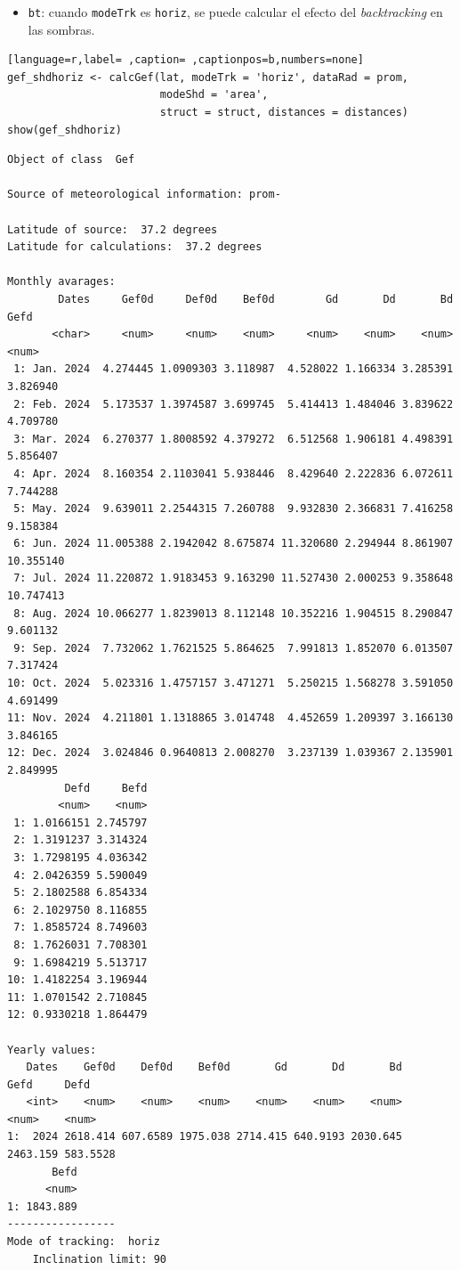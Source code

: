\begin{itemize}
\item \texttt{bt}: cuando \texttt{modeTrk} es \texttt{horiz}, se puede calcular el efecto del \emph{backtracking} en las sombras.
\end{itemize}
\begin{lstlisting}[language=r,label= ,caption= ,captionpos=b,numbers=none]
gef_shdhoriz <- calcGef(lat, modeTrk = 'horiz', dataRad = prom,
                        modeShd = 'area',
                        struct = struct, distances = distances)
show(gef_shdhoriz)
\end{lstlisting}

\begin{verbatim}
Object of class  Gef 

Source of meteorological information: prom- 

Latitude of source:  37.2 degrees
Latitude for calculations:  37.2 degrees

Monthly avarages:
        Dates     Gef0d     Def0d    Bef0d        Gd       Dd       Bd      Gefd
       <char>     <num>     <num>    <num>     <num>    <num>    <num>     <num>
 1: Jan. 2024  4.274445 1.0909303 3.118987  4.528022 1.166334 3.285391  3.826940
 2: Feb. 2024  5.173537 1.3974587 3.699745  5.414413 1.484046 3.839622  4.709780
 3: Mar. 2024  6.270377 1.8008592 4.379272  6.512568 1.906181 4.498391  5.856407
 4: Apr. 2024  8.160354 2.1103041 5.938446  8.429640 2.222836 6.072611  7.744288
 5: May. 2024  9.639011 2.2544315 7.260788  9.932830 2.366831 7.416258  9.158384
 6: Jun. 2024 11.005388 2.1942042 8.675874 11.320680 2.294944 8.861907 10.355140
 7: Jul. 2024 11.220872 1.9183453 9.163290 11.527430 2.000253 9.358648 10.747413
 8: Aug. 2024 10.066277 1.8239013 8.112148 10.352216 1.904515 8.290847  9.601132
 9: Sep. 2024  7.732062 1.7621525 5.864625  7.991813 1.852070 6.013507  7.317424
10: Oct. 2024  5.023316 1.4757157 3.471271  5.250215 1.568278 3.591050  4.691499
11: Nov. 2024  4.211801 1.1318865 3.014748  4.452659 1.209397 3.166130  3.846165
12: Dec. 2024  3.024846 0.9640813 2.008270  3.237139 1.039367 2.135901  2.849995
         Defd     Befd
        <num>    <num>
 1: 1.0166151 2.745797
 2: 1.3191237 3.314324
 3: 1.7298195 4.036342
 4: 2.0426359 5.590049
 5: 2.1802588 6.854334
 6: 2.1029750 8.116855
 7: 1.8585724 8.749603
 8: 1.7626031 7.708301
 9: 1.6984219 5.513717
10: 1.4182254 3.196944
11: 1.0701542 2.710845
12: 0.9330218 1.864479

Yearly values:
   Dates    Gef0d    Def0d    Bef0d       Gd       Dd       Bd     Gefd     Defd
   <int>    <num>    <num>    <num>    <num>    <num>    <num>    <num>    <num>
1:  2024 2618.414 607.6589 1975.038 2714.415 640.9193 2030.645 2463.159 583.5528
       Befd
      <num>
1: 1843.889
-----------------
Mode of tracking:  horiz 
    Inclination limit: 90
\end{verbatim}

